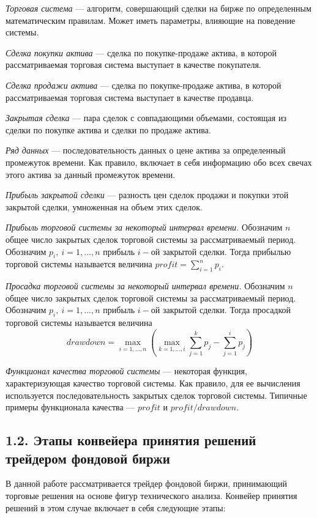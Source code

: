 \documentclass[12pt]{article}
\begin{document}
{\it Торговая система} --- алгоритм, совершающий сделки на бирже по определенным математическим правилам. Может иметь параметры, влияющие на поведение системы.

{\it Сделка покупки актива} --- сделка по покупке-продаже актива, в которой рассматриваемая торговая система выступает в качестве покупателя.

{\it Сделка продажи актива} --- сделка по покупке-продаже актива, в которой рассматриваемая торговая система выступает в качестве продавца.

{\it Закрытая сделка} --- пара сделок с совпадающими объемами, состоящая из сделки по покупке актива и сделки по продаже актива.

{\it Ряд данных} --- последовательность данных о цене актива за определенный промежуток времени. Как правило, включает в себя информацию обо всех свечах этого актива за данный промежуток времени.

{\it Прибыль закрытой сделки} --- разность цен сделок продажи и покупки этой закрытой сделки, умноженная на объем этих сделок.

{\it Прибыль торговой системы за некоторый интервал времени.} Обозначим $n$ общее число закрытых сделок торговой системы за рассматриваемый период. Обозначим $p_i,~i=1,...,n$ прибыль $i-$ой закрытой сделки. Тогда прибылью торговой системы называется величина $profit=\sum\limits_{i=1}^n{p_i}$.

{\it Просадка торговой системы за некоторый интервал времени.} Обозначим $n$ общее число закрытых сделок торговой системы за рассматриваемый период. Обозначим $p_i,~i=1,...,n$ прибыль $i-$ой закрытой сделки. Тогда просадкой торговой системы называется величина $$drawdown=\max\limits_{i=1,...,n}\left(\max\limits_{k=1,...,i}\sum\limits_{j=1}^kp_j - \sum\limits_{j=1}^ip_j\right)$$

{\it Функционал качества торговой системы} --- некоторая функция, характеризующая качество торговой системы. Как правило, для ее вычисления используется последовательность закрытых сделок торговой системы. Типичные примеры функционала качества --- $profit$ и $profit/drawdown$.
\subsection{1.2. Этапы конвейера принятия решений трейдером фондовой биржи}
В данной работе рассматривается трейдер фондовой биржи, принимающий торговые решения на основе фигур технического анализа. Конвейер принятия решений в этом случае включает в себя следующие этапы:
\end{document}
